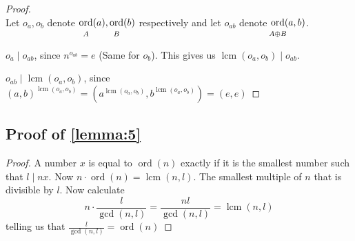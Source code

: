 \documentclass{article}
\newcommand{\ordgroup}[1]{\ord_{\rule{0pt}{9pt}\mathclap{#1}}}
\DeclareMathOperator{\ordb}{ord}
\newcommand{\ord}{\mathop{\ordb}\limits}
\DeclareMathOperator{\lcm}{lcm}
\newenvironment{pg}{

}{

\medskip

}
\begin{document}
	\usebox{\proveLemmaThree}
	
	\begin{proof} \rule{0pt}{0pt}\\
		Let $o_a, o_b$ denote $\ordgroup{A}(a), \ordgroup{B}(b)$ respectively and let $o_{ab}$ denote $\ordgroup{A \oplus B}(a,b)$.
		\begin{pg}
			$o_a \mid o_{ab}$, since $n^{o_{ab}} = e$ (Same for $o_b$). This gives us $\lcm(o_a, o_b) \mid o_{ab}$.
		\end{pg}
		\begin{pg}
			$o_{ab} \mid \lcm(o_a, o_b)$, since $(a,b)^{\lcm(o_a, o_b)} = (a^{\lcm(o_a, o_b)}, b^{\lcm(o_a, o_b)}) = (e,e)$
		\end{pg}
	\end{proof}
	
	\subsection{\texorpdfstring{Proof of \cref{lemma:5}}{Proof of Lemma 5}}\label{sec:proveLemmaFive}
	
	\usebox{\proveLemmaFive}
	
	\begin{proof}
		A number $x$ is equal to $\ord(n)$ exactly if it is the smallest number such that $l \mid nx$. Now $n · \ord(n) = \lcm(n, l)$. The smallest multiple of $n$ that is divisible by $l$.
		Now calculate
		\begin{equation*}
			n · \frac{l}{\gcd(n,l)} = \frac{nl}{\gcd(n,l)} = \lcm(n,l)
		\end{equation*}
		telling us that $\frac{l}{\gcd(n,l)} = \ord(n)$
	\end{proof}
	
	\printbibliography
\end{document}
